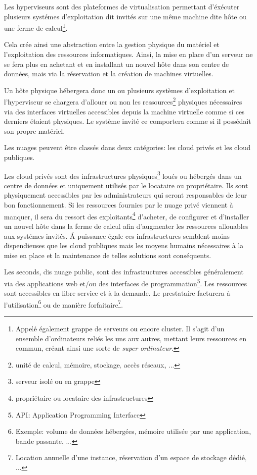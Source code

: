 \documentclass[11pt, a4paper ]{article}
\begin{document}
\begin{spacing}{1.5}
Les hyperviseurs sont des plateformes de virtualisation permettant d'éxécuter plusieurs systémes d'exploitation dit invités sur une même machine dite hôte ou une ferme de calcul\footnote{Appelé également grappe de serveurs ou encore cluster. Il s'agit d'un ensemble d'ordinateurs reliés les uns aux autres, mettant leurs ressources en commun, créant ainsi une sorte de \emph{super ordinateur}. }.

Cela crée ainsi une abstraction entre la gestion physique du matériel et l'exploitation des ressources informatiques. Ainsi, la mise en place d'un serveur ne se fera plus en achetant et en installant un nouvel hôte dans son centre de données, mais via la réservation et la création de machines virtuelles.

Un hôte physique hébergera donc un ou plusieurs systèmes d'exploitation et l'hyperviseur se chargera d'allouer ou non les ressources\footnote{unité de calcul, mémoire, stockage, accès réseaux, ...}  physiques nécessaires via des interfaces virtuelles accessibles depuis la machine virtuelle comme si ces derniers étaient physiques. Le système invité ce comportera comme si il possédait son propre matériel.

Les nuages peuvent être classés dans deux catégories: les cloud privés et les cloud publiques.


Les cloud privés sont des infrastructures physiques\footnote{serveur isolé ou en grappe} loués ou hébergés dans un centre de données et uniquement utilisés par le locataire ou propriétaire. Ils sont physiquement accessibles par les administrateurs qui seront responsables de leur bon fonctionnement. Si les ressources fournies par le nuage privé viennent à manquer, il sera du ressort des exploitants\footnote{propriétaire ou locataire des infrastructures} d'acheter, de configurer et d'installer un nouvel hôte dans la ferme de calcul afin d'augmenter les ressources allouables aux systémes invités. Á puissance égale ces infrastructures semblent moins dispendieuses que les cloud publiques mais les moyens humains nécessaires à la mise en place et la maintenance de telles solutions sont conséquents.

Les seconds, dis nuage public, sont des infrastructures accessibles généralement via des applications web et/ou des interfaces de programmation\footnote{API: Application Programming Interface}. Les ressources sont accessibles en libre service et à la demande. Le prestataire facturera à l'utilisation\footnote{Exemple: volume de données hébergées, mémoire utilisée par une application, bande passante, ...} ou de manière forfaitaire\footnote{Location annuelle d'une instance, réservation d'un espace de stockage dédié, ...}.


\end{spacing}
\end{document}
